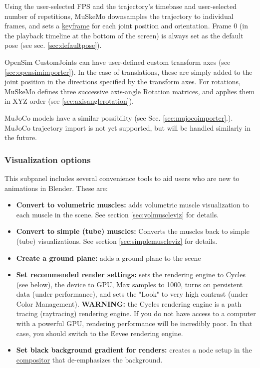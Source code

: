 \documentclass{article}
\begin{document}
Using the user-selected FPS and the trajectory's timebase and user-selected number of repetitions, MuSkeMo downsamples the trajectory to individual frames, and sets a \href{https://docs.blender.org/manual/en/latest/animation/keyframes/index.html}{keyframe} for each joint position and orientation. Frame 0 (in the playback timeline at the bottom of the screen) is always set as the default pose (see sec. \ref{sec:defaultpose}).

OpenSim CustomJoints can have user-defined custom transform axes (see \ref{sec:opensimimporter}). In the case of translations, these are simply added to the joint position in the directions specified by the transform axes. For rotations, MuSkeMo defines three successive axis-angle Rotation matrices, and applies them in XYZ order (see \ref{sec:axisanglerotation}).

MuJoCo models have a similar possibility (see Sec. \ref{sec:mujocoimporter}.). MuJoCo trajectory import is not yet supported, but will be handled similarly in the future.

\subsubsection{Visualization options}

This subpanel includes several convenience tools to aid users who are new to animations in Blender. These are:

\begin{itemize}
    \item \textbf{Convert to volumetric muscles:} adds volumetric muscle visualization to each muscle in the scene. See section \ref{sec:volmuscleviz} for details.
    \item \textbf{Convert to simple (tube) muscles:} Converts the muscles back to simple (tube) visualizations. See section \ref{sec:simplemuscleviz} for details.
    \item \textbf{Create a ground plane:} adds a ground plane to the scene
    \item \textbf{Set recommended render settings:} sets the rendering engine to Cycles (see below), the device to GPU, Max samples to 1000, turns on persistent data (under performance), and sets the "Look" to very high contrast (under Color Management). \textbf{WARNING:} the Cycles rendering engine is a path tracing (raytracing) rendering engine. If you do not have access to a computer with a powerful GPU, rendering performance will be incredibly poor. In that case, you should switch to the Eevee rendering engine.
    \item \textbf{Set black background gradient for renders:} creates a node setup in the \href{https://docs.blender.org/manual/en/latest/compositing/index.html}{compositor} that de-emphasizes the background.
\end{itemize}
\end{document}
